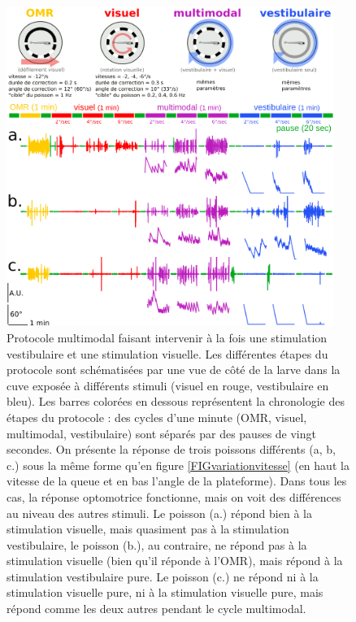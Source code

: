 \begin{figure}
    \centering
    \includegraphics[width=0.95\textwidth]{./files/protocole_multimodal.svg.png}
    \caption{
    Protocole multimodal faisant intervenir à la fois une stimulation vestibulaire et une stimulation visuelle. Les différentes étapes du protocole sont schématisées par une vue de côté de la larve dans la cuve exposée à différents stimuli (visuel en rouge, vestibulaire en bleu). Les barres colorées en dessous représentent la chronologie des étapes du protocole : des cycles d'une minute (OMR, visuel, multimodal, vestibulaire) sont séparés par des pauses de vingt secondes.
    On présente la réponse de trois poissons différents (a, b, c.) sous la même forme qu'en figure \ref{FIGvariationvitesse} (en haut la vitesse de la queue et en bas l'angle de la plateforme). Dans tous les cas, la réponse optomotrice fonctionne, mais on voit des différences au niveau des autres stimuli. Le poisson (a.) répond bien à la stimulation visuelle, mais quasiment pas à la stimulation vestibulaire, le poisson (b.), au contraire, ne répond pas à la stimulation visuelle (bien qu'il réponde à l'OMR), mais répond à la stimulation vestibulaire pure. Le poisson (c.) ne répond ni à la stimulation visuelle pure, ni à la stimulation visuelle pure, mais répond comme les deux autres pendant le cycle multimodal.
    \label{FIGprotocolmulti}}
    \end{figure} 

